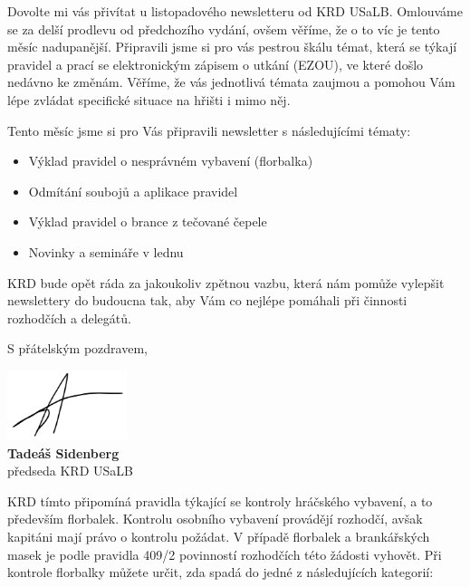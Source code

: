 \documentclass{newsletter}
\begin{document}
Dovolte mi vás přivítat u listopadového newsletteru od KRD USaLB. Omlouváme se za delší prodlevu od předchozího vydání, ovšem věříme, že o to víc je tento měsíc nadupanější. Připravili jsme si pro vás pestrou škálu témat, která se týkají pravidel a prací se elektronickým zápisem o utkání (EZOU), ve které došlo nedávno ke změnám. Věříme, že vás jednotlivá témata zaujmou a pomohou Vám lépe zvládat specifické situace na hřišti i mimo něj.

Tento měsíc jsme si pro Vás připravili newsletter s následujícími tématy:
\begin{itemize}
	\item Výklad pravidel o nesprávném vybavení (florbalka)
	\item Odmítání soubojů a aplikace pravidel
	\item Výklad pravidel o brance z tečované čepele
	\item Novinky a semináře v lednu
\end{itemize}

KRD bude opět ráda za jakoukoliv zpětnou vazbu, která nám pomůže vylepšit newslettery do budoucna tak, aby Vám co nejlépe pomáhali při činnosti rozhodčích a delegátů.

S přátelským pozdravem,

\begin{flushleft}
	\vspace{3\baselineskip}
	\includegraphics[width=3.5cm, keepaspectratio]{tadeas_sidenberg_podpis}\\
	\textbf{Tadeáš Sidenberg}\\
	předseda KRD USaLB
\end{flushleft}

\pagebreak
{}
KRD tímto připomíná pravidla týkající se kontroly hráčského vybavení, a to především florbalek. Kontrolu osobního vybavení provádějí rozhodčí, avšak kapitáni mají právo o kontrolu požádat. V případě florbalek a brankářských masek je podle pravidla 409/2 povinností rozhodčích této žádosti vyhovět. Při kontrole florbalky můžete určit, zda spadá do jedné z následujících kategorií:
\end{document}
